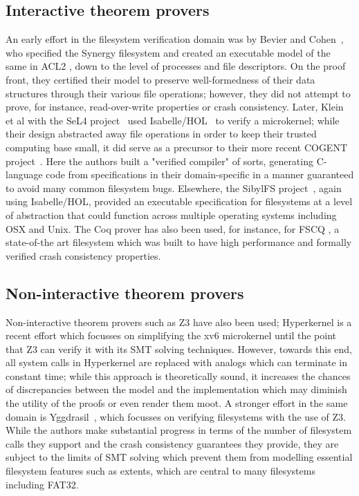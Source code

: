 \documentclass[submission,copyright,creativecommons]{eptcs}
\begin{document}
\subsection{Interactive theorem provers}
An early effort in the filesystem verification domain was by Bevier
and Cohen~\cite{bevier1996executable}, who specified the Synergy
filesystem and created an executable model of the same in ACL2
\cite{kaufmann2000}, down to the level of processes
and file descriptors. On the proof front, they certified their model
to preserve well-formedness of their data structures through their
various file operations; however, they did not attempt to prove, for
instance, read-over-write properties or crash consistency. Later,
Klein et al with the SeL4 project~\cite{klein2009sel4} used
Isabelle/HOL~\cite{nipkow2002isabelle} to verify a microkernel;
while their design abstracted away file operations in order to keep
their trusted computing base small, it did serve as a precursor to their
more recent COGENT project~\cite{amani2016cogent}. Here the authors
built a "verified compiler" of sorts, generating C-language code from
specifications in their domain-specific in a manner guaranteed to
avoid many common filesystem bugs. Elsewhere, the SibylFS
project~\cite{ridge2015sibylfs}, again using Isabelle/HOL, provided
an executable specification for filesystems at a level of abstraction
that could function across multiple operating systems including OSX
and Unix. The Coq prover \cite{bertot2013interactive} has also been
used, for instance, for FSCQ
\cite{DBLP:conf/usenix/ChenZCCKZ16}, a state-of-the art filesystem
which was built to have high performance and formally verified crash
consistency properties.

\subsection{Non-interactive theorem provers}
Non-interactive theorem provers such as Z3 \cite{de2008z3}
have also been used; Hyperkernel
\cite{Nelson:2017:HPV:3132747.3132748} is a recent effort which
focusses on simplifying the xv6 microkernel until the point that Z3
can verify it with its SMT solving techniques. However, towards this
end, all system calls in Hyperkernel are replaced with analogs which
can terminate in constant time; while this approach is theoretically
sound, it increases the chances of discrepancies between the model and
the implementation which may diminish the utility of the proofs or
even render them moot. A stronger effort in the same domain is
Yggdrasil~\cite{sigurbjarnarson2016push}, which focusses on verifying
filesystems with the use of Z3. While the authors make substantial
progress in terms of the number of filesystem calls they support and
the crash consistency guarantees they provide, they are subject to
the limits of SMT solving which prevent them from modelling essential
filesystem features such as extents, which are central to many
filesystems including FAT32.
\end{document}
